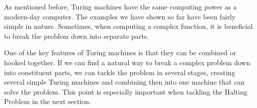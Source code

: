 \documentclass[../../../include/open-logic-section]{subfiles}
\begin{document}

\begin{explain}
As mentioned before, Turing machines have the same computing
power as a modern-day computer. The examples we have shown
so far have been fairly simple in nature. Sometimes, when computing
a complex function, it is beneficial to break the problem down into 
separate parts.

One of the key features of Turing machines is that they can
be combined or hooked together. If we can find a natural way to break
a complex problem down into constituent parts, we can tackle the
problem in several stages, creating several simple Turing machines and
combining then into one machine that can solve the problem. This point
is especially important when tackling the Halting Problem in the next 
section.
\end{explain}
\end{document}
